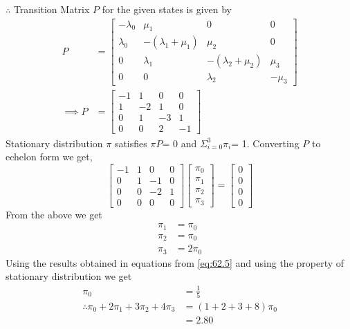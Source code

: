 \documentclass[journal,12pt,twocolumn]{IEEEtran}
\theoremstyle{remark}
\begin{document}
$\therefore$ Transition Matrix $P$ for the given states is given by 
\begin{equation}
\label{eq:62.3}
\begin{split}
P &= \begin{bmatrix}
-\lambda_0 & \mu_1 & 0 & 0 \\
\lambda_0 & -(\lambda_1 + \mu_1) & \mu_2 & 0 \\
0 & \lambda_1 & -(\lambda_2 + \mu_2) & \mu_3\\
0 & 0 & \lambda_2 & -\mu_3
\end{bmatrix}\\
\implies 
P &= \begin{bmatrix}
-1 & 1 & 0 & 0 \\
1 & -2 & 1 & 0 \\
0 & 1 & -3 & 1\\
0 & 0 & 2 & -1
\end{bmatrix}
\end{split}
\end{equation}
Stationary distribution $\pi$ satisfies $\pi$$P$= 0 and $\Sigma_{i=0}^{3}\pi_i$= 1. Converting $P$ to echelon form we get,
\begin{equation}
\label{eq:62.4}
\begin{bmatrix}
-1 & 1 & 0 & 0 \\
0 & 1 & -1 & 0 \\
0 & 0 & -2 & 1\\
0 & 0 & 0 & 0
\end{bmatrix}
\begin{bmatrix}
\pi_0\\
\pi_1\\
\pi_2\\
\pi_3
\end{bmatrix} =
\begin{bmatrix}
0\\
0\\
0\\
0
\end{bmatrix}
\end{equation}
From the above we get
\begin{equation}
\label{eq:62.5}
\begin{split}
\pi_1 &= \pi_0\\
\pi_2 &= \pi_0\\
\pi_3 &= 2\pi_0
\end{split}
\end{equation}
Using the results obtained in equations from \eqref{eq:62.5} and using the property of stationary distribution we get 
\begin{equation}
\begin{split}
\pi_0 &= \frac{1}{5}\\
\therefore \pi_0 + 2\pi_1 + 3\pi_2 + 4\pi_3 &= (1+2+3+8)\pi_0\\
&= 2.80
\end{split}
\end{equation}
\end{document}
